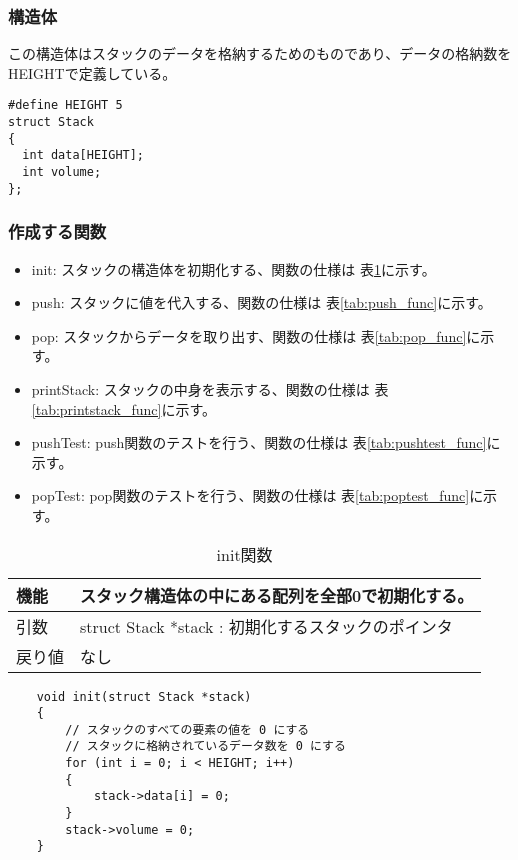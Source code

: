 \documentclass[dvipdfmx]{jsarticle}
\begin{document}
\subsubsection{構造体}
この構造体はスタックのデータを格納するためのものであり、データの格納数をHEIGHTで定義している。
\begin{lstlisting}[caption={stack.h}, label={lst:stackh}]
#define HEIGHT 5
struct Stack
{
  int data[HEIGHT];
  int volume;
};
\end{lstlisting}
\subsubsection{作成する関数}
\begin{itemize}
  \item init: スタックの構造体を初期化する、関数の仕様は 表\ref{tab:init_func}に示す。
  \item push: スタックに値を代入する、関数の仕様は 表\ref{tab:push_func}に示す。
  \item pop: スタックからデータを取り出す、関数の仕様は 表\ref{tab:pop_func}に示す。
  \item printStack: スタックの中身を表示する、関数の仕様は 表\ref{tab:printstack_func}に示す。
  \item pushTest: push関数のテストを行う、関数の仕様は 表\ref{tab:pushtest_func}に示す。
  \item popTest: pop関数のテストを行う、関数の仕様は 表\ref{tab:poptest_func}に示す。
\end{itemize}

\begin{table}[ht]
  \centering
  \begin{tabular}{|p{5cm}|p{10cm}|}
    \hline
    機能  & スタック構造体の中にある配列を全部0で初期化する。                  \\
    \hline
    引数  & struct Stack *stack : 初期化するスタックのポインタ       \\
    \hline
    戻り値 & なし                                         \\
  \end{tabular}
  \begin{lstlisting}
    void init(struct Stack *stack)
    {
        // スタックのすべての要素の値を 0 にする
        // スタックに格納されているデータ数を 0 にする
        for (int i = 0; i < HEIGHT; i++)
        {
            stack->data[i] = 0;
        }
        stack->volume = 0;
    }
  \end{lstlisting}
  \caption{init関数}
  \label{tab:init_func}
\end{table}
\end{document}
